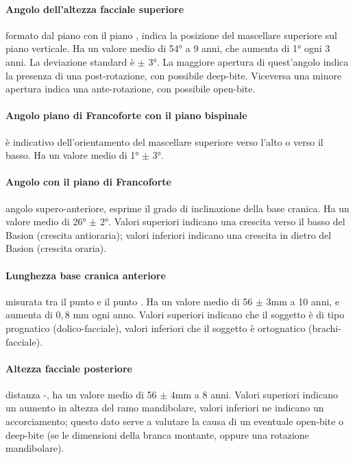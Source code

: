 \paragraph{Angolo dell'altezza facciale superiore} formato dal piano  con il piano , indica la posizione del mascellare superiore sul piano verticale. Ha un valore medio di 54° a 9 anni, che aumenta di 1° ogni 3 anni. La deviazione standard è $\pm$ 3°. La maggiore apertura di quest'angolo indica la presenza di una post-rotazione, con possibile deep-bite. Viceversa una minore apertura indica una ante-rotazione, con possibile open-bite.

\paragraph{Angolo piano di Francoforte con il piano bispinale} è indicativo dell'orientamento del mascellare superiore verso l'alto o verso il basso. Ha un valore medio di 1° $\pm$ 3°.

\paragraph{Angolo  con il piano di Francoforte} angolo supero-anteriore, esprime il grado di inclinazione della base cranica. Ha un valore medio di 26° $\pm$ 2°. Valori superiori indicano una crescita verso il basso del Basion (crescita antioraria); valori inferiori indicano una crescita in dietro del Basion (crescita oraria).

\paragraph{Lunghezza base cranica anteriore} misurata tra il punto  e il punto . Ha un valore medio di 56 $\pm$ 3mm a 10 anni, e aumenta di $0,8$ mm ogni anno. Valori superiori indicano che il soggetto è di tipo prognatico (dolico-facciale), valori inferiori che il soggetto è ortognatico (brachi-facciale).

\paragraph{Altezza facciale posteriore} distanza -, ha un valore medio di 56 $\pm$ 4mm a 8 anni. Valori superiori indicano un aumento in altezza del ramo mandibolare, valori inferiori ne indicano un accorciamento; questo dato serve a valutare la causa di un eventuale open-bite o deep-bite (se le dimensioni della branca montante, oppure una rotazione mandibolare).

